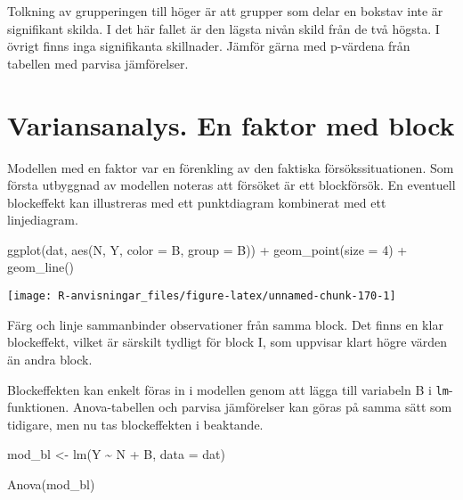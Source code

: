 \documentclass[
]{book}
\newenvironment{Shaded}{\begin{snugshade}}{\end{snugshade}}
\newcommand{\AttributeTok}[1]{\textcolor[rgb]{0.77,0.63,0.00}{#1}}
\newcommand{\DecValTok}[1]{\textcolor[rgb]{0.00,0.00,0.81}{#1}}
\newcommand{\FunctionTok}[1]{\textcolor[rgb]{0.00,0.00,0.00}{#1}}
\newcommand{\NormalTok}[1]{#1}
\newcommand{\OtherTok}[1]{\textcolor[rgb]{0.56,0.35,0.01}{#1}}
\newcommand{\SpecialCharTok}[1]{\textcolor[rgb]{0.00,0.00,0.00}{#1}}
\theoremstyle{definition}
\theoremstyle{definition}
\theoremstyle{definition}
\theoremstyle{definition}
\theoremstyle{remark}
\begin{document}
Tolkning av grupperingen till höger är att grupper som delar en bokstav inte är signifikant skilda. I det här fallet är den lägsta nivån skild från de två högsta. I övrigt finns inga signifikanta skillnader. Jämför gärna med p-värdena från tabellen med parvisa jämförelser.

\hypertarget{variansanalys.-en-faktor-med-block}{%
\section{Variansanalys. En faktor med block}\label{variansanalys.-en-faktor-med-block}}

Modellen med en faktor var en förenkling av den faktiska försökssituationen. Som första utbyggnad av modellen noteras att försöket är ett blockförsök. En eventuell blockeffekt kan illustreras med ett punktdiagram kombinerat med ett linjediagram.

\begin{Shaded}
\begin{Highlighting}[]
\FunctionTok{ggplot}\NormalTok{(dat, }\FunctionTok{aes}\NormalTok{(N, Y, }\AttributeTok{color =}\NormalTok{ B, }\AttributeTok{group =}\NormalTok{ B)) }\SpecialCharTok{+}
  \FunctionTok{geom\_point}\NormalTok{(}\AttributeTok{size =} \DecValTok{4}\NormalTok{) }\SpecialCharTok{+}
  \FunctionTok{geom\_line}\NormalTok{()}
\end{Highlighting}
\end{Shaded}

\begin{center}\texttt{[image: R-anvisningar\_files/figure-latex/unnamed-chunk-170-1]} \end{center}

Färg och linje sammanbinder observationer från samma block. Det finns en klar blockeffekt, vilket är särskilt tydligt för block I, som uppvisar klart högre värden än andra block.

Blockeffekten kan enkelt föras in i modellen genom att lägga till variabeln B i \texttt{lm}-funktionen. Anova-tabellen och parvisa jämförelser kan göras på samma sätt som tidigare, men nu tas blockeffekten i beaktande.

\begin{Shaded}
\begin{Highlighting}[]
\NormalTok{mod\_bl }\OtherTok{\textless{}{-}} \FunctionTok{lm}\NormalTok{(Y }\SpecialCharTok{\textasciitilde{}}\NormalTok{ N }\SpecialCharTok{+}\NormalTok{ B, }\AttributeTok{data =}\NormalTok{ dat)}

\FunctionTok{Anova}\NormalTok{(mod\_bl)}
\end{Highlighting}
\end{Shaded}
\end{document}
